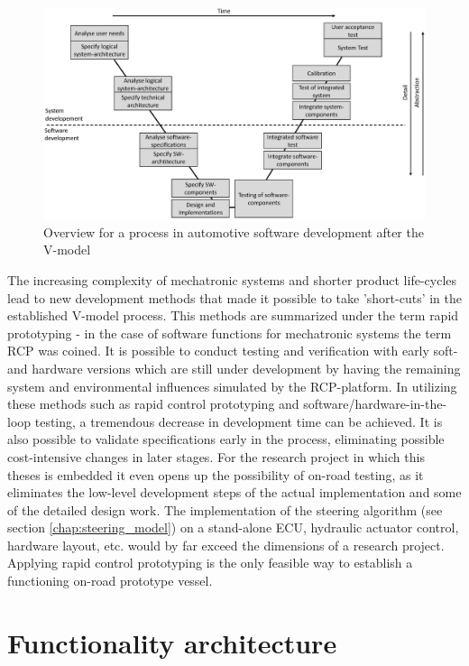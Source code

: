 \documentclass[ExampleMasters.tex]{subfiles}
\begin{document}
\begin{figure}[!htb]
	\centering
	\includegraphics[width=0.9\linewidth]{figures/v_model/Folie1}
	\caption{Overview for a process in automotive software development after the V-model}
	\label{fig:v_model}
\end{figure}



The increasing complexity of mechatronic systems and shorter product life-cycles lead to new development methods that made it possible to take 'short-cuts' in the established V-model process. This methods are summarized under the term rapid prototyping - in the case of software functions for mechatronic systems the term \gls{RCP} was coined. It is possible to conduct testing and verification with early soft- and hardware versions which are still under development by having the remaining system and environmental influences simulated by the \gls{RCP}-platform. In utilizing these methods such as rapid control prototyping and software/hardware-in-the-loop testing, a tremendous decrease in development time can be achieved. It is also possible to validate specifications early in the process, eliminating possible cost-intensive changes in later stages.\cite{rapidcontrolprototyping} For the research project in which this theses is embedded it even opens up the possibility of on-road testing, as it eliminates the low-level development steps of the actual implementation and some of the detailed design work. The implementation of the steering algorithm (see section \ref{chap:steering_model}) on a stand-alone ECU, hydraulic actuator control, hardware layout, etc. would by far exceed the dimensions of a research project. Applying rapid control prototyping is the only feasible way to establish a functioning on-road prototype vessel.




\section{Functionality architecture}
\label{sec:func_architecture}
\end{document}
